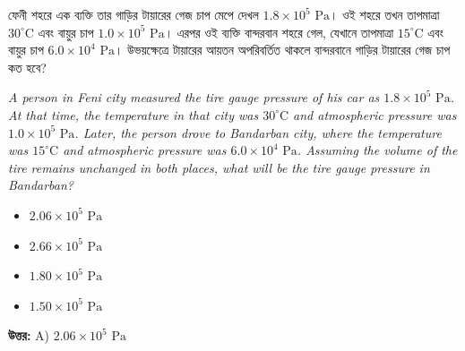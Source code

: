 \documentclass[12pt, a4paper]{article}
\begin{document}
\begin{tcolorbox}[questionbox={প্রশ্ন (Question) 13}]
    \noindent
    ফেনী শহরে এক ব্যক্তি তার গাড়ির টায়ারের গেজ চাপ মেপে দেখল $1.8 \times 10^5\text{ Pa}$। ওই শহরে তখন তাপমাত্রা $30^\circ\text{C}$ এবং বায়ুর চাপ $1.0 \times 10^5\text{ Pa}$। এরপর ওই ব্যক্তি বান্দরবান শহরে গেল, যেখানে তাপমাত্রা $15^\circ\text{C}$ এবং বায়ুর চাপ $6.0 \times 10^4\text{ Pa}$। উভয়ক্ষেত্রে টায়ারের আয়তন অপরিবর্তিত থাকলে বান্দরবানে গাড়ির টায়ারের গেজ চাপ কত হবে?
    
    \vspace{0.8em}
    \begin{english}
    \noindent\textit{\color{darkgray}
    A person in Feni city measured the tire gauge pressure of his car as $1.8 \times 10^5\text{ Pa}$. At that time, the temperature in that city was $30^\circ\text{C}$ and atmospheric pressure was $1.0 \times 10^5\text{ Pa}$. Later, the person drove to Bandarban city, where the temperature was $15^\circ\text{C}$ and atmospheric pressure was $6.0 \times 10^4\text{ Pa}$. Assuming the volume of the tire remains unchanged in both places, what will be the tire gauge pressure in Bandarban?
    }
    \end{english}
\end{tcolorbox}

\begin{itemize}[label={}, leftmargin=1cm, itemsep=0.5em]
    \item[\textbf{A)}] $2.06 \times 10^5\text{ Pa}$
    \item[\textbf{B)}] $2.66 \times 10^5\text{ Pa}$
    \item[\textbf{C)}] $1.80 \times 10^5\text{ Pa}$
    \item[\textbf{D)}] $1.50 \times 10^5\text{ Pa}$
\end{itemize}

\vspace{0.5em}
\begin{tcolorbox}[answerbox]
    \textbf{\color{success} উত্তর:} A) $2.06 \times 10^5\text{ Pa}$
\end{tcolorbox}
\vspace{1em}
\end{document}
